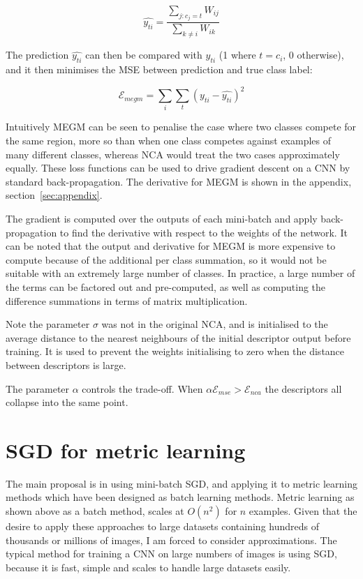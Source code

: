 \begin{equation}
\label{eq:megm_pred}
\hat{y_{ti}} = \frac{\sum_{j:c_j = t}W_{ij}}{\sum_{k \neq i}{W_{ik}}}
\end{equation}

The prediction $ \hat{y_{ti}} $ can then be compared with $ y_{ti} $ (1 where $ t = c_i $, 0 otherwise), and it then minimises the \gls{MSE} between prediction and true class label:

\begin{equation}
\label{eq:megm_loss}
\mathcal{E}_{megm} =  \sum_i\sum_t{(y_{ti} - \hat{y_{ti}})^2}
\end{equation}

Intuitively \gls{MEGM} can be seen to penalise the case where two classes compete for the same region,  more so than when one class competes against examples of many different classes, whereas \gls{NCA} would treat the two cases approximately equally. These loss functions can be used to drive gradient descent on a \gls{CNN} by standard back-propagation. The derivative for \gls{MEGM} is shown in the appendix, section~\ref{sec:appendix}.

The gradient is computed over the outputs of each mini-batch and apply back-propagation to find the derivative with respect to the weights of the network. It can be noted that the output and derivative for \gls{MEGM} is more expensive to compute because of the additional per class summation, so it would not be suitable with an extremely large number of classes. In practice, a large number of the terms can be factored out and pre-computed, as well as computing the difference summations in terms of matrix multiplication.

Note the parameter $ \sigma $ was not in the original \gls{NCA}, and is initialised to the average distance to the nearest neighbours of the initial descriptor output before training. It is used to prevent the weights initialising to zero when the distance between descriptors is large.


The parameter $\alpha $ controls the trade-off. When $ \alpha \mathcal{E}_{mse} > \mathcal{E}_{nca} $ the descriptors all collapse into the same point.


\section{SGD for metric learning}

The main proposal is in using mini-batch \gls{SGD}, and applying it to metric learning methods which have been designed as batch learning methods. Metric learning as shown above as a batch method, scales at $ O(n^2) $ for $ n $ examples. Given that the desire to apply these approaches to large datasets containing hundreds of thousands or millions of images, I am forced to consider approximations. The typical method for training a \gls{CNN} on large numbers of images is using \gls{SGD}, because it is fast, simple and scales to handle large datasets easily. 

